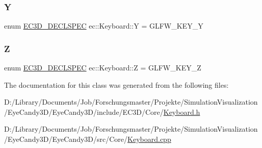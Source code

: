 \mbox{\label{classec_1_1_keyboard_a3e6065997f9693286591e1300769e13a}} 
\subsubsection{\texorpdfstring{Y}{Y}}
{\footnotesize\ttfamily enum \mbox{\hyperlink{_common_8h_aac42573e202ca3dd4d259c81691e2369}{E\+C3\+D\+\_\+\+D\+E\+C\+L\+S\+P\+EC}} ec\+::\+Keyboard\+::Y = G\+L\+F\+W\+\_\+\+K\+E\+Y\+\_\+Y}

\mbox{\label{classec_1_1_keyboard_a342c1ef739e9fd209135017e48f25c58}} 
\subsubsection{\texorpdfstring{Z}{Z}}
{\footnotesize\ttfamily enum \mbox{\hyperlink{_common_8h_aac42573e202ca3dd4d259c81691e2369}{E\+C3\+D\+\_\+\+D\+E\+C\+L\+S\+P\+EC}} ec\+::\+Keyboard\+::Z = G\+L\+F\+W\+\_\+\+K\+E\+Y\+\_\+Z}



The documentation for this class was generated from the following files\+:\begin{DoxyCompactItemize}
\item 
D\+:/\+Library/\+Documents/\+Job/\+Forschungsmaster/\+Projekte/\+Simulation\+Visualization/\+Eye\+Candy3\+D/\+Eye\+Candy3\+D/include/\+E\+C3\+D/\+Core/\mbox{\hyperlink{_keyboard_8h}{Keyboard.\+h}}\item 
D\+:/\+Library/\+Documents/\+Job/\+Forschungsmaster/\+Projekte/\+Simulation\+Visualization/\+Eye\+Candy3\+D/\+Eye\+Candy3\+D/src/\+Core/\mbox{\hyperlink{_keyboard_8cpp}{Keyboard.\+cpp}}\end{DoxyCompactItemize}
